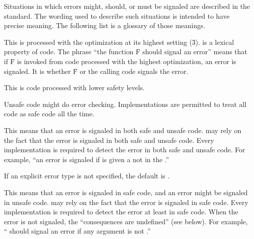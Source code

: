 \endsubsubsection%

\endsubSection%



Situations in which errors might, should, or must be signaled are described
in the standard.  The wording used to describe such situations is intended
to have precise meaning. The following list is a glossary of those meanings.

\beginlist
{}

This is  processed with the  optimization 
at its highest setting (\f{3}).   is a lexical property
of code.  The phrase ``the function \f{F} should signal an error'' 
means that if \f{F} is invoked from code processed with the highest
 optimization, an error is signaled.
It is  whether \f{F} or the calling 
code signals the error.


This is code processed with lower safety levels.
		        
Unsafe code might do error checking.  Implementations are permitted to
treat all code as safe code all the time.
                        
%

This means that an error is signaled in both safe and unsafe code.
 may rely on the fact that the error is signaled
in both safe and unsafe code.  Every implementation is required to
detect the error in both safe and unsafe code. For example, ``an error
is signaled if  is given a 
not  in the .''

If an explicit error type is not specified, the default is .

%

This means that an error is signaled in safe code, and an error
might be signaled in unsafe code.   may rely on the
fact that the error is signaled in safe code.  Every
implementation is required to detect the error at least in safe code.
When the error is not signaled, the ``consequences are undefined''
(see below).  For example, ``\funref{+} should signal an error 
if any argument is not .''

